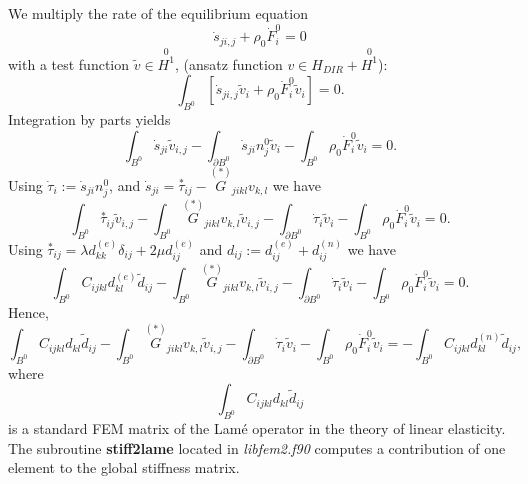 We multiply the rate of the equilibrium equation
\begin{equation}\nonumber
\dot{s}_{ji,j}+\rho_0\dot{F}^0_i=0
\end{equation}
with a test function $\tilde{v}\in \stackrel{0}{H^1}$, (ansatz function $v \in H_{DIR}+\stackrel{0}{H^1}$): 
\begin{equation}\nonumber
\int_{B^0}\left[\dot{s}_{ji,j}\tilde{v}_i+\rho_0\dot{F}^0_i\tilde{v}_i\right]=0.
\end{equation}
Integration by parts yields
\begin{equation}\nonumber
\int_{B^0}\dot{s}_{ji}\tilde{v}_{i,j}-\int_{\partial B^0}\dot{s}_{ji}n^0_{j}\tilde{v}_i-\int_{B^0}\rho_0\dot{F}^0_i\tilde{v}_i=0.
\end{equation}
Using $\dot{\tau}_i:=\dot{s}_{ji}n^0_{j}$, and $\dot{s}_{ji}=\stackrel{*}{\tau}_{ij}-\stackrel{(*)}{G}_{jikl}v_{k,l}$
we have 
\begin{equation}\nonumber
\int_{B^0}\stackrel{*}{\tau}_{ij}\tilde{v}_{i,j}-\int_{B^0}\stackrel{(*)}{G}_{jikl}v_{k,l}\tilde{v}_{i,j}-\int_{\partial B^0}\dot{\tau}_i\tilde{v}_i-\int_{B^0}\rho_0\dot{F}^0_i\tilde{v}_i=0.
\end{equation}
Using $\stackrel{*}{\tau}_{ij}=\lambda d^{(e)}_{kk}\delta_{ij}+2\mu d^{(e)}_{ij}$ and $d_{ij}:= d^{(e)}_{ij}+ d^{(n)}_{ij}$ we have
\begin{equation}\nonumber
\int_{B^0}C_{ijkl}d^{(e)}_{kl}\tilde{d}_{ij}-\int_{B^0}\stackrel{(*)}{G}_{jikl}v_{k,l}\tilde{v}_{i,j}-\int_{\partial B^0}\dot{\tau}_i\tilde{v}_i-\int_{B^0}\rho_0\dot{F}^0_i\tilde{v}_i=0.
\end{equation}
Hence,
\begin{equation}\label{eq:DiscreteEquation}
\int_{B^0}C_{ijkl}d_{kl}\tilde{d}_{ij}-\int_{B^0}\stackrel{(*)}{G}_{jikl}v_{k,l}\tilde{v}_{i,j}-\int_{\partial B^0}\dot{\tau}_i\tilde{v}_i-\int_{B^0}\rho_0\dot{F}^0_i\tilde{v}_i=-\int_{B^0}C_{ijkl}d^{(n)}_{kl}\tilde{d}_{ij},
\end{equation}
where \begin{equation}
\int_{B^0}C_{ijkl}d_{kl}\tilde{d}_{ij}
\end{equation}
is a standard FEM matrix of the Lam\'e operator in the theory of linear elasticity. The subroutine  \textbf{stiff2lame} located in \textit{libfem2.f90}  computes a contribution of one element to the  global stiffness matrix.

